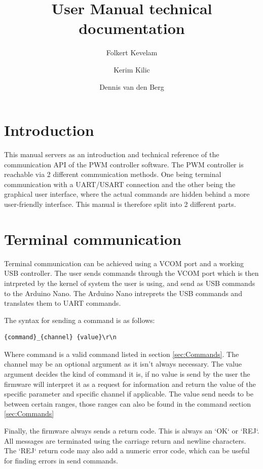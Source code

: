 \documentclass{article}
\title{User Manual technical documentation}
\author{Folkert Kevelam \and Kerim Kilic \and Dennis van den Berg}
\begin{document}
\maketitle
{}
\newpage
\tableofcontents
\newpage

\newpage
\section{Introduction}
This manual servers as an introduction and technical reference of the communication
API of the PWM controller software. The PWM controller is reachable via 2 different
communication methods. One being terminal communication with a UART/USART connection
and the other being the graphical user interface, where the actual commands are hidden
behind a more user-friendly interface. This manual is therefore split into 2 different
parts.

\section{Terminal communication}
Terminal communication can be achieved using a VCOM port and a working USB controller.
The user sends commands through the VCOM port which is then intrpreted by the kernel
of system the user is using, and send as USB commands to the Arduino Nano. The Arduino Nano
intreprets the USB commands and translates them to UART commands.

The syntax for sending a command is as follows: \\
\begin{lstlisting}
{command}_{channel} {value}\r\n
\end{lstlisting}

Where command is a valid command listed in section \ref{sec:Commands}. The channel
may be an optional argument as it isn't always necessary. The value argument
decides the kind of command it is, if no value is send by the user the firmware
will interpret it as a request for information and return the value of the specific
parameter and specific channel if applicable. The value send needs to be between
certain ranges, those ranges can also be found in the command section \ref{sec:Commands}

Finally, the firmware always sends a return code. This is always an `OK` or `REJ`.
All messages are terminated using the carriage return and newline characters.
The `REJ` return code may also add a numeric error code, which can be useful
for finding errors in send commands.
\newpage
\end{document}
